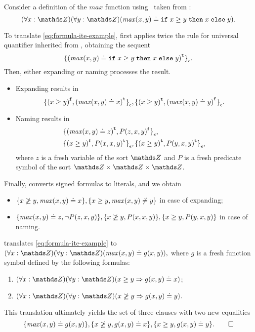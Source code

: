\begin{example*} Consider a definition of the $\mathit{max}$ function using \ITE\ taken from \cite{VampireAndFOOL}:
\begin{equation}\label{eq:formula-ite-example}
  (\forall x:\Z)(\forall y:\Z)(\mathit{max}(x, y) \eql \ite{x \geq y}{x}{y}).
\end{equation}

To translate \eqref{eq:formula-ite-example}, \nfcnf{} first applies twice the rule for universal quantifier inherited from \newcnf, obtaining the sequent $${ \{ {(\mathit{max}(x, y) \doteq \mathtt{if}\;{x \geq y}\;\allowbreak\mathtt{then}\;{x}\;\allowbreak\mathtt{else}\;{y})}^{\mathtt{t}} \} }_{\epsilon}.$$ Then, either expanding or naming processes the result.
\begin{itemize}
  \item Expanding results in $${ \{ {(x \geq y)}^{\mathtt{f}}, {(\mathit{max}(x,y) \doteq x)}^{\mathtt{t}} \} }_{\epsilon},
  { \{ {(x \geq y)}^{\mathtt{t}}, {(\mathit{max}(x,y) \doteq y)}^{\mathtt{f}} \} }_{\epsilon}.$$
  \item Naming results in
  \begin{align*}
  &{ \{ {(\mathit{max}(x,y)\doteq z)}^{\mathtt{t}}, {P(z, x, y)}^{\mathtt{f}} \} }_{\epsilon},\\
  &{ \{ {(x \geq y)}^{\mathtt{f}}, {P(x,x,y)}^{\mathtt{t}} \} }_{\epsilon},
  { \{ {(x \geq y)}^{\mathtt{t}}, {P(y,x,y)}^{\mathtt{t}} \} }_{\epsilon},
  \end{align*}
  where $z$ is a fresh variable of the sort $\Z$ and $P$ is a fresh predicate symbol of the sort $\Z \times \Z \times \Z$.
\end{itemize}

Finally, \newcnf{} converts signed formulas to literals, and we obtain
\begin{itemize}
  \item $\{ x \not\geq y, \mathit{max}(x,y) \doteq x \}, \{ x \geq y, \mathit{max}(x,y) \not\doteq y \}$ in case of expanding;
  \item $\{ \mathit{max}(x,y)\doteq z, \neg P(z, x, y) \},
  \{ x \not\geq y, P(x,x,y) \},
  \{ x \geq y, P(y,x,y) \}$ in case of naming.
\end{itemize}

\oldcnf{} translates \eqref{eq:formula-ite-example} to $(\forall x:\Z)(\forall y:\Z)(\mathit{max}(x, y) \eql g(x, y)),$ where $g$ is a fresh function symbol defined by the following formulas:
\begin{enumerate}
  \item $(\forall x:\Z)(\forall y:\Z)(x \geq y \implies g(x, y) \eql x)$;
  \item $(\forall x:\Z)(\forall y:\Z)(x \not\geq y \implies g(x, y) \eql y).$
\end{enumerate}
This translation ultimately yields the set of three clauses with two new equalities
\begin{equation*}
\{\mathit{max}(x,y) \eql g(x,y)\}, \{x \not\geq y, g(x,y) \eql x\}, \{x \geq y, g(x,y) \eql y\}.\QED
\end{equation*}
\end{example*}

